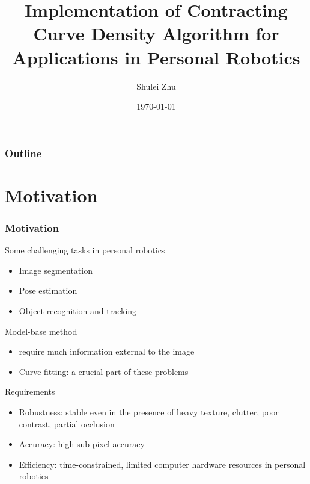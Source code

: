 \documentclass[english,10pt,presentation]{beamer}
\title{Implementation of Contracting Curve Density Algorithm for Applications in Personal Robotics}
\author{Shulei Zhu}
\date{\today}
\begin{document}
\maketitle

\begin{frame}
\frametitle{Outline}
\setcounter{tocdepth}{2}
\tableofcontents
\end{frame}

\section{Motivation}
\label{sec-1}
\begin{frame}
\frametitle{Motivation}
\label{sec-1_1}
\begin{alertblock}{Some challenging tasks in personal robotics}
\label{sec-1_1_1}
\begin{itemize}

\item Image segmentation\\
\label{sec-1_1_1_1}%
\item Pose estimation\\
\label{sec-1_1_1_2}%
\item Object recognition and tracking\\
\label{sec-1_1_1_3}%
\end{itemize} %
\end{alertblock}
\begin{block}{Model-base method}
\label{sec-1_1_2}
\begin{itemize}

\item require much information external to the image\\
\label{sec-1_1_2_1}%
\item Curve-fitting: a crucial part of these problems\\
\label{sec-1_1_2_2}%
\end{itemize} %
\end{block}
\begin{exampleblock}{Requirements}
\label{sec-1_1_3}
\begin{itemize}

\item Robustness: stable even in the presence of heavy texture, clutter, poor contrast, partial occlusion\\
\label{sec-1_1_3_1}%
\item Accuracy: high sub-pixel accuracy\\
\label{sec-1_1_3_2}%
\item Efficiency: time-constrained, limited computer hardware resources in personal robotics\\
\label{sec-1_1_3_3}%
\end{itemize} %
\end{exampleblock}
\end{frame}
\end{document}
